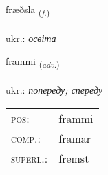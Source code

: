 \documentclass[frontgrid, backgrid]{flacards}\usepackage[]{graphicx}\usepackage[]{xcolor}
\begin{document}
\renewcommand{\flhead}{\vskip5pt \fboxsep=0pt {\small\bfseries\footnotesize Nafnorð | іменник}}
\renewcommand{\fcfoot}{\vskip5pt \fboxsep=0pt \hspace{2pt}{\small\bfseries\footnotesize 2K}}

\renewcommand{\blhead}{\vskip5pt {\small\bfseries\footnotesize Nafnorð | іменник }}
\renewcommand{\bcfoot}{\vskip5pt \hspace{2pt}{\small\bfseries\footnotesize 2K}}


{fræðsla \small{\textsubscript{(\textit{f.})}} \\[1ex] %
\textphonetic{[fraiðstla]} \\
ukr.: \emph{освіта} \\  [2ex]
\renewcommand*{\arraystretch}{0.8}
}

\renewcommand{\flhead}{\vskip5pt \fboxsep=0pt {\small\bfseries\footnotesize Atviksorð | прислівник}}
\renewcommand{\fcfoot}{\vskip5pt \fboxsep=0pt \hspace{2pt}{\small\bfseries\footnotesize 2K}}

\renewcommand{\blhead}{\vskip5pt {\small\bfseries\footnotesize Atviksorð | прислівник }}
\renewcommand{\bcfoot}{\vskip5pt \hspace{2pt}{\small\bfseries\footnotesize 2K}}


{frammi \small{\textsubscript{(\textit{adv.})}} \\[1ex] %
\textphonetic{[framɪ]} \\
ukr.: \emph{попереду; спереду} \\  [2ex]
\renewcommand*{\arraystretch}{0.8}
\begin{tabular}{ll}
\textsc{pos}: & frammi \\ 
\textsc{comp.}: & framar \\ 
\textsc{superl.}: & fremst \\
\end{tabular}
}
\end{document}
